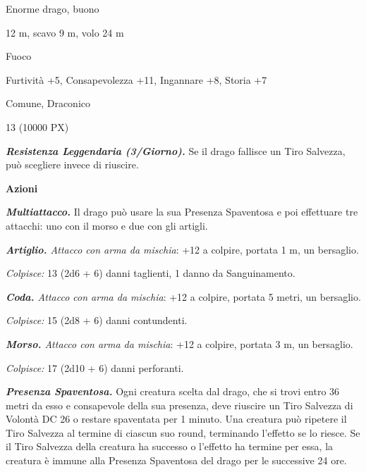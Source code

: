 \begin{multicols}{2}
{
\begin{description}[noitemsep, topsep=0pt, parsep=0pt, partopsep=0pt, itemsep=1pt, leftmargin=2.35cm,  labelwidth=2.2cm, itemindent=0cm, listparindent=0pt] %
\setlength{\baselineskip}{10pt}
\item[\textbf{Taglia/Tipo}] Enorme drago, buono
\item[\textbf{Caratt.}] 
\item[\textbf{Punti Ferita}] 
\item[\textbf{Movimento}] 12 m, scavo 9 m, volo 24 m
\item[\textbf{Tiri Salvez.}] 
\item[\textbf{Imm. Danni}] Fuoco
\item[\textbf{Comp.}] Furtività +5, Consapevolezza +11, Ingannare +8, Storia +7
\item[\textbf{Sensi}] 
\item[\textbf{Linguaggi}] Comune, Draconico
\item[\textbf{Sfida}] 13 (10000 PX)
\end{description}
\smallskip

\emph{\textbf{Resistenza Leggendaria (3/Giorno).}} Se il drago fallisce un Tiro Salvezza, può scegliere invece di riuscire.

\textbf{Azioni}

\emph{\textbf{Multiattacco.}} Il drago può usare la sua Presenza Spaventosa e poi effettuare tre attacchi: uno con il morso e due con gli artigli.

\emph{\textbf{Artiglio.} Attacco con arma da mischia}: +12 a colpire, portata 1 m, un bersaglio.

\emph{Colpisce:} 13 (2d6 + 6) danni taglienti, 1 danno da Sanguinamento.

\emph{\textbf{Coda.} Attacco con arma da mischia}: +12 a colpire, portata 5 metri, un bersaglio.

\emph{Colpisce:} 15 (2d8 + 6) danni contundenti.

\emph{\textbf{Morso.} Attacco con arma da mischia}: +12 a colpire, portata 3 m, un bersaglio.

\emph{Colpisce:} 17 (2d10 + 6) danni perforanti.

\emph{\textbf{Presenza Spaventosa.}} Ogni creatura scelta dal drago, che si trovi entro 36 metri da esso e consapevole della sua presenza, deve riuscire un Tiro Salvezza di Volontà DC 26 o restare spaventata per 1 minuto. Una creatura può ripetere il Tiro Salvezza al termine di ciascun suo round, terminando l'effetto se lo riesce. Se il Tiro Salvezza della creatura ha successo o l'effetto ha termine per essa, la creatura è immune alla Presenza Spaventosa del drago per le successive 24 ore.

}
\end{multicols}

